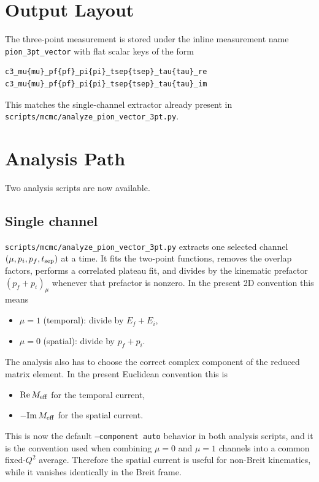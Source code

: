 \documentclass[11pt]{article}
\begin{document}
\section{Output Layout}
The three-point measurement is stored under the inline measurement name
\texttt{pion\_3pt\_vector} with flat scalar keys of the form
\begin{verbatim}
c3_mu{mu}_pf{pf}_pi{pi}_tsep{tsep}_tau{tau}_re
c3_mu{mu}_pf{pf}_pi{pi}_tsep{tsep}_tau{tau}_im
\end{verbatim}
This matches the single-channel extractor already present in
\texttt{scripts/mcmc/analyze\_pion\_vector\_3pt.py}.

\section{Analysis Path}
Two analysis scripts are now available.

\subsection{Single channel}
\texttt{scripts/mcmc/analyze\_pion\_vector\_3pt.py} extracts one selected
channel $(\mu,p_i,p_f,t_{\rm sep})$ at a time. It fits the two-point
functions, removes the overlap factors, performs a correlated plateau fit, and
divides by the kinematic prefactor $(p_f+p_i)_\mu$ whenever that prefactor is
nonzero. In the present 2D convention this means
\begin{itemize}
  \item $\mu=1$ (temporal): divide by $E_f+E_i$,
  \item $\mu=0$ (spatial): divide by $p_f+p_i$.
\end{itemize}
The analysis also has to choose the correct complex component of the reduced
matrix element. In the present Euclidean convention this is
\begin{itemize}
  \item $\mathrm{Re}\,M_{\rm eff}$ for the temporal current,
  \item $-\mathrm{Im}\,M_{\rm eff}$ for the spatial current.
\end{itemize}
This is now the default \texttt{--component auto} behavior in both analysis
scripts, and it is the convention used when combining $\mu=0$ and $\mu=1$
channels into a common fixed-$Q^2$ average.
Therefore the spatial current is useful for non-Breit kinematics, while it
vanishes identically in the Breit frame.
\end{document}
